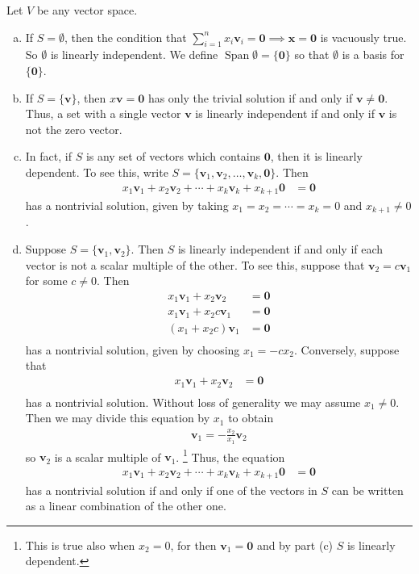 \documentclass[12pt,letterpaper,reqno]{article}
\numberwithin{equation}{section}
\DeclareMathOperator{\Span}{Span}
\begin{document}
\begin{example}
Let $V$ be any vector space.
\begin{enumerate}[(a)]
	\item If $S=\emptyset$, then the condition that $\sum_{i=1}^nx_i\mathbf{v}_i=\mathbf{0} \implies \mathbf{x}=\mathbf{0}$ is vacuously true. So $\emptyset$ is linearly independent. We define $\Span \emptyset=\{\mathbf{0}\}$ so that $\emptyset$ is a basis for $\{\mathbf{0}\}$.
	\item  If $S=\{\mathbf{v}\}$, then $x\mathbf{v}=\mathbf{0}$ has only the trivial solution if and only if $\mathbf{v} \neq \mathbf{0}$. Thus, a set with a single vector $\mathbf{v}$ is linearly independent if and only if $\mathbf{v}$ is not the zero vector.
	\item In fact, if $S$ is any set of vectors which contains $\mathbf{0}$, then it is linearly dependent. To see this, write $S=\{\mathbf{v}_1,\mathbf{v}_2,\dots,\mathbf{v}_k,\mathbf{0}\}$. Then
	\begin{align*}
		x_1\mathbf{v}_1+x_2\mathbf{v}_2+\cdots+x_k\mathbf{v}_k+x_{k+1}\mathbf{0}&=\mathbf{0}
	\end{align*} 
	has a nontrivial solution, given by taking $x_1=x_2=\cdots=x_k=0$ and $x_{k+1} \neq 0$.
	\item Suppose $S=\{\mathbf{v}_1,\mathbf{v}_2\}$. Then $S$ is linearly independent if and only if each vector is not a scalar multiple of the other. To see this, suppose that $\mathbf{v}_2=c\mathbf{v}_1$ for some $c \neq 0$. Then
	\begin{align*}
		x_1\mathbf{v}_1+x_2\mathbf{v}_2&=\mathbf{0} \\
		x_1\mathbf{v}_1+x_2c\mathbf{v}_1&=\mathbf{0} \\
		(x_1+x_2c)\mathbf{v}_1&=\mathbf{0} \\
	\end{align*}
	has a nontrivial solution, given by choosing $x_1=-cx_2$. Conversely, suppose that 
	\begin{align*}
		x_1\mathbf{v}_1+x_2\mathbf{v}_2&=\mathbf{0} \\
	\end{align*}
	has a nontrivial solution. Without loss of generality we may assume $x_1 \neq 0$. Then we may divide this equation by $x_1$ to obtain
	\begin{align*}
		\mathbf{v}_1=-\frac{x_2}{x_1}\mathbf{v}_2
	\end{align*}
	so $\mathbf{v}_2$ is a scalar multiple of $\mathbf{v}_1$. \footnote{This is true also when $x_2=0$, for then $\mathbf{v}_1=\mathbf{0}$ and by part (c) $S$ is linearly dependent.} Thus, the equation
	\begin{align*}
		x_1\mathbf{v}_1+x_2\mathbf{v}_2+\cdots+x_k\mathbf{v}_k+x_{k+1}\mathbf{0}&=\mathbf{0}
	\end{align*}
	has a nontrivial solution if and only if one of the vectors in $S$ can be written as a linear combination of the other one.
\end{enumerate}	
\end{example}
\end{document}
